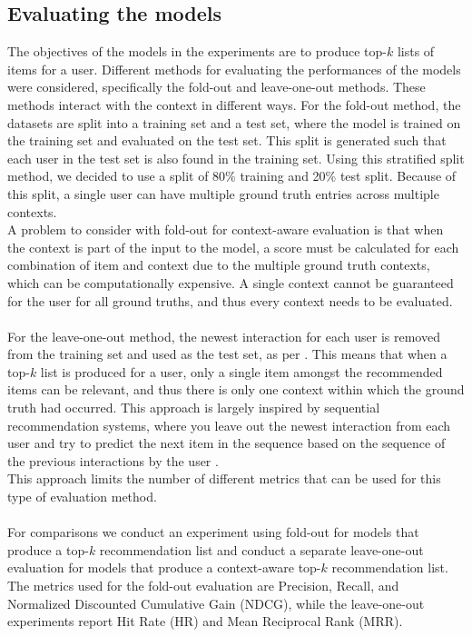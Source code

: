 \subsection{Evaluating the models}\label{subsec:evalandmetrics}
The objectives of the models in the experiments are to produce top-$k$ lists of items for a user. 
Different methods for evaluating the performances of the models were considered, specifically the fold-out and leave-one-out methods.
These methods interact with the context in different ways.
For the fold-out method, the datasets are split into a training set and a test set, where the model is trained on the training set and evaluated on the test set. 
This split is generated such that each user in the test set is also found in the training set.
Using this stratified split method, we decided to use a split of 80\% training and 20\% test split.
Because of this split, a single user can have multiple ground truth entries across multiple contexts.\\
A problem to consider with fold-out for context-aware evaluation is that when the context is part of the input to the model, a score must be calculated for each combination of item and context due to the multiple ground truth contexts, which can be computationally expensive.
A single context cannot be guaranteed for the user for all ground truths, and thus every context needs to be evaluated.
\\\\
For the leave-one-out method, the newest interaction for each user is removed from the training set and used as the test set, as per \cite{CFM, BPR}.
This means that when a top-$k$ list is produced for a user, only a single item amongst the recommended items can be relevant, and thus there is only one context within which the ground truth had occurred.
This approach is largely inspired by sequential recommendation systems, where you leave out the newest interaction from each user and try to predict the next item in the sequence based on the sequence of the previous interactions by the user \cite{aggarwal2016recommender}.\\
This approach limits the number of different metrics that can be used for this type of evaluation method.
\\\\
For comparisons we conduct an experiment using fold-out for models that produce a top-$k$ recommendation list and conduct a separate leave-one-out evaluation for models that produce a context-aware top-$k$ recommendation list. 
The metrics used for the fold-out evaluation are Precision, Recall, and Normalized Discounted Cumulative Gain (NDCG), while the leave-one-out experiments report Hit Rate (HR) and Mean Reciprocal Rank (MRR).

